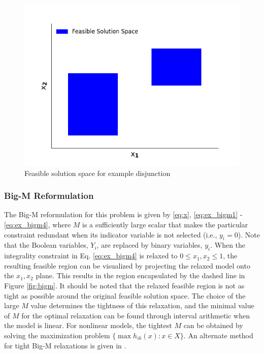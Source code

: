 \documentclass{juliacon}
\begin{document}
\begin{figure}
    \centering
    \includegraphics[scale=0.5]{solnspace.png}
    \caption{Feasible solution space for example disjunction}
    \label{fig:reform_figure}
\end{figure}
\vskip 6pt

 \subsubsection{Big-M Reformulation}
 The Big-M reformulation for this problem is given by \eqref{eq:x}, \eqref{eq:ex_bigm1} - \eqref{eq:ex_bigm4}, where $M$ is a sufficiently large scalar that makes the particular constraint redundant when its indicator variable is not selected (i.e., $y_i = 0$). Note that the Boolean variables, $Y_i$, are replaced by binary variables, $y_i$. When the integrality constraint in Eq. \eqref{eq:ex_bigm4} is relaxed to $0 \leq x_1, x_2 \leq 1$, the resulting feasible region can be visualized by projecting the relaxed model onto the $x_1, x_2$ plane. This results in the region encapsulated by the dashed line in Figure \ref{fig:bigm}. It should be noted that the relaxed feasible region is not as tight as possible around the original feasible solution space. The choice of the large $M$ value determines the tightness of this relaxation, and the minimal value of $M$ for the optimal relaxation can be found through interval arithmetic when the model is linear. For nonlinear models, the tightest $M$ can be obtained by solving the maximization problem $\{\max h_{ik}(x): x \in X\}$. An alternate method for tight Big-M relaxations is given in \cite{TRESPALACIOS201598}.
 
\end{document}
